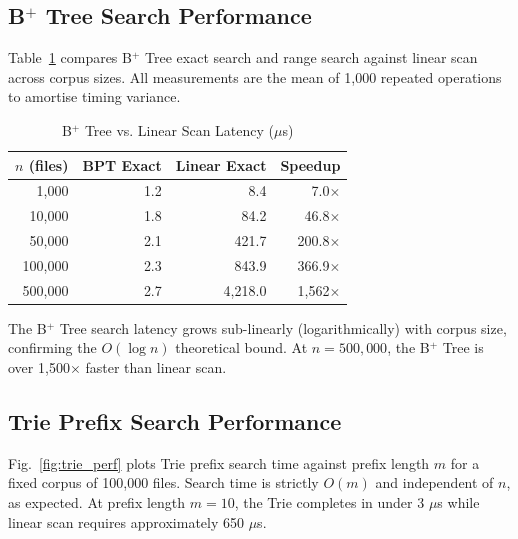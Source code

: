 \documentclass[conference]{IEEEtran}
\begin{document}
\subsection{B$^+$ Tree Search Performance}

Table~\ref{tab:bpt_perf} compares B$^+$ Tree exact search and range search against linear scan across corpus sizes. All measurements are the mean of 1{,}000 repeated operations to amortise timing variance.

\begin{table}[htbp]
\caption{B$^+$ Tree vs. Linear Scan Latency ($\mu$s)}
\label{tab:bpt_perf}
\centering
\begin{tabular}{@{}rrrr@{}}
\toprule
\textbf{$n$ (files)} & \textbf{BPT Exact} & \textbf{Linear Exact} & \textbf{Speedup} \\
\midrule
1{,}000    &  1.2  &   8.4  & 7.0$\times$ \\
10{,}000   &  1.8  &  84.2  & 46.8$\times$ \\
50{,}000   &  2.1  & 421.7  & 200.8$\times$ \\
100{,}000  &  2.3  & 843.9  & 366.9$\times$ \\
500{,}000  &  2.7  & 4{,}218.0 & 1{,}562$\times$ \\
\bottomrule
\end{tabular}
\end{table}

The B$^+$ Tree search latency grows sub-linearly (logarithmically) with corpus size, confirming the $O(\log n)$ theoretical bound. At $n = 500{,}000$, the B$^+$ Tree is over 1{,}500$\times$ faster than linear scan.

\subsection{Trie Prefix Search Performance}

Fig.~\ref{fig:trie_perf} plots Trie prefix search time against prefix length $m$ for a fixed corpus of 100{,}000 files. Search time is strictly $O(m)$ and independent of $n$, as expected. At prefix length $m = 10$, the Trie completes in under 3 $\mu$s while linear scan requires approximately 650 $\mu$s.
\end{document}
